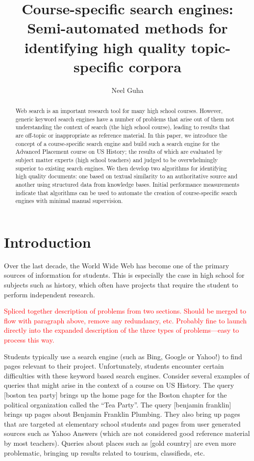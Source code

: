\documentclass{acm_proc_article-sp}
\begin{document}
\title{Course-specific search engines: Semi-automated methods for identifying
  high quality topic-specific corpora} 

\author{
  \alignauthor
  Neel Guha \\
}

\maketitle
\begin{abstract}
Web search is an important research tool for many high school courses. However,
generic keyword search engines have a number of problems that arise out of them
not understanding the context of search (the high school course),
leading to results that are off-topic or inappropriate as reference material. In
this paper, we introduce the concept of a course-specific search 
engine and build such a search engine for the Advanced Placement course on US
History; the results of which are evaluated by subject matter experts (high
school teachers) and judged to be overwhelmingly superior to existing search engines. We
then develop two algorithms for identifying high quality documents: one 
based on textual similarity to an authoritative source and another using structured
data from knowledge bases. Initial performance measurements indicate that
algorithms can be used to automate the creation of course-specific search
engines with minimal manual supervision.
\end{abstract}

\section{Introduction}

Over the last decade, the World Wide Web has become one of the primary sources
of information for students. This is especially the case in high school for
subjects such as history, which often have projects that require the student to
perform independent research. 

\textcolor{red}{Spliced together description of problems from two sections. Should be
  merged to flow with paragraph above, remove any redundancy, etc. Probably fine
  to launch directly into the expanded description of the three types of
  problems---easy to process this way.}

Students typically use a search engine (such as Bing, Google or Yahoo!) to find
pages relevant to their project. Unfortunately, students encounter certain
difficulties with these keyword based search engines.  Consider several examples
of queries that might arise in the context of a course on US History. The query
[boston tea party] brings up the home page for the Boston chapter for the
political organization called the ``Tea Party''. The query [benjamin franklin]
brings up pages about Benjamin Franklin Plumbing. They also bring up pages that
are targeted at elementary school students and pages from user generated sources
such as Yahoo Answers  (which are not considered good reference material by most
teachers). Queries about places such as [gold country] are even more
problematic, bringing up results related to tourism, classifieds, etc. 
\end{document}
